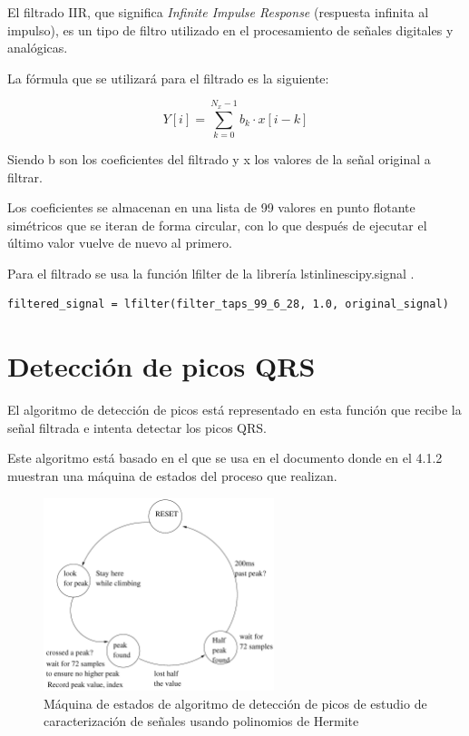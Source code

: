 El filtrado IIR, que significa \textit{Infinite Impulse Response} (respuesta infinita al impulso),
es un tipo de filtro utilizado en el procesamiento de señales digitales y analógicas.

La fórmula que se utilizará para el filtrado es la siguiente:

\[ Y[i] = \sum_{k=0}^{N_x -1} b_k \cdot x[i-k] \]

Siendo b son los coeficientes del filtrado y x los valores de la señal original a filtrar.

Los coeficientes se almacenan en una lista de 99 valores en punto flotante simétricos que se iteran de forma 
circular, con lo que después de ejecutar el último valor vuelve de nuevo al primero.  

Para el filtrado se usa la función lfilter de la librería lstinline{scipy.signal} \cite{SciPy}.

\lstset{language=python, breaklines=true, basicstyle=\footnotesize}
\begin{lstlisting}[frame=single]
    filtered_signal = lfilter(filter_taps_99_6_28, 1.0, original_signal)
\end{lstlisting}

\section{Detección de picos QRS}

El algoritmo de detección de picos está representado en esta función que 
recibe la señal filtrada e intenta detectar los picos QRS.

Este algoritmo está basado en el que se usa en el documento \cite{desai2021low} 
donde en el 4.1.2 muestran una máquina de estados del proceso que realizan.

\begin{figure}[h!]
    \centering
    \includegraphics[width=0.6\textwidth]{./Images/img_algoritmo/fsm_mdpi.png}
    \caption{Máquina de estados de algoritmo de detección de picos de estudio de caracterización de señales usando polinomios de Hermite \cite{desai2021low}}
    \label{fig:fsm_mpdi}
\end{figure}

